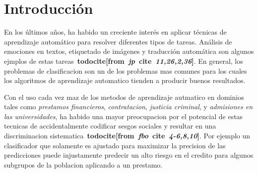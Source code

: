 \chapter*{Introducción}\label{chapter:introduction}

\newcommand{\todocite}[2]{\textbf{todocite[from~\textit{#1}~cite~\textit{#2}]}}



En los últimos años, ha habido un creciente interés en aplicar técnicas de aprendizaje automático para resolver diferentes tipos de tareas.
Análisis de emociones en textos, etiquetado de imágenes y traducción automática son algunos ejmplos de estas tareas~\todocite{jp}{11,26,2,36}.
En general, los problemas de clasificacion son un de los problemas mas comunes para los cuales los algoritmos de aprendizaje automatico tienden a producir buenos resultados.


Con el uso cada vez maz de los metodos de aprendizaje autmatico en dominios tales como \emph{prestamos financieros}, \emph{contratacion}, \emph{justicia criminal}, y \emph{admisiones en las universidades}, ha habido una mayor preocupacion por el potencial de estas tecnicas de accidentalmente codificar sesgos sociales y resultar en una discriminacion sistematica~\todocite{fbo}{4-6,8,10}.
Por ejemplo un clasificador que solamente es ajustado para maximizar la precision de las predicciones puede injustamente predecir un alto riesgo en el credito para algunos subgrupos de la poblacion aplicando a un prestamo.





